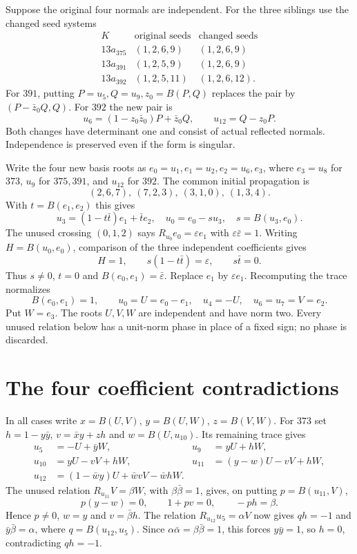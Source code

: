 \documentclass[11pt]{article}
\begin{document}
Suppose the original four normals are independent. For the three
siblings use the changed seed systems
\[
\begin{array}{c|c|c}
K&\text{original seeds}&\text{changed seeds}\\\hline
13a_{375}&(1,2,6,9)&(1,2,6,9)\\
13a_{391}&(1,2,5,9)&(1,2,6,9)\\
13a_{392}&(1,2,5,11)&(1,2,6,12).
\end{array}
\]
For $391$, putting $P=u_5,Q=u_9,z_0=B(P,Q)$ replaces the pair by
$(P-\bar z_0Q,Q)$. For $392$ the new pair is
\[
 u_6=(1-z_0\bar z_0)P+\bar z_0Q,
 \qquad u_{12}=Q-z_0P.
\]
Both changes have determinant one and consist of actual reflected
normals. Independence is preserved even if the form is singular.

Write the four new basis roots as $e_0=u_1,e_1=u_2,e_2=u_6,e_3$,
where $e_3=u_8$ for $373$, $u_9$ for $375,391$, and $u_{12}$ for
$392$. The common initial propagation is
\[
 (2,6,7),\ (7,2,3),\ (3,1,0),\ (1,3,4).
\]
With $t=B(e_1,e_2)$ this gives
\[
 u_3=(1-t\bar t)e_1+\bar t e_2,
 \quad u_0=e_0-su_3,\quad s=B(u_3,e_0).
\]
The unused crossing $(0,1,2)$ says
$R_{u_0}e_0=\varepsilon e_1$ with $\varepsilon\bar\varepsilon=1$.
Writing $H=B(u_0,e_0)$, comparison of the three independent
coefficients gives
\[
 H=1,\qquad s(1-t\bar t)=\varepsilon,\qquad s\bar t=0.
\]
Thus $s\ne0$, $t=0$ and $B(e_0,e_1)=\bar\varepsilon$.
Replace $e_1$ by $\varepsilon e_1$. Recomputing the trace normalizes
\[
 B(e_0,e_1)=1,\qquad u_0=U=e_0-e_1,
 \quad u_4=-U,\quad u_6=u_7=V=e_2.
\]
Put $W=e_3$. The roots $U,V,W$ are independent and have norm two.
Every unused relation below has a unit-norm phase in place of a
fixed sign; no phase is discarded.

\section{The four coefficient contradictions}

In all cases write $x=B(U,V)$, $y=B(U,W)$, $z=B(V,W)$.
For $373$ set $h=1-y\bar y$, $v=\bar x y+zh$ and
$w=B(U,u_{10})$. Its remaining trace gives
\[
\begin{aligned}
u_5&=-U+\bar yW,&u_9&=yU+hW,\\
u_{10}&=yU-vV+hW,&u_{11}&=(y-w)U-vV+hW,\\
u_{12}&=(1-\bar w y)U+\bar w vV-\bar w hW.
\end{aligned}
\]
The unused relation $R_{u_{11}}V=\beta W$, with $\beta\bar\beta=1$,
gives, on putting $p=B(u_{11},V)$,
\[
 p(y-w)=0,\qquad 1+pv=0,\qquad -ph=\beta.
\]
Hence $p\ne0$, $w=y$ and $v=\bar\beta h$.
The relation $R_{u_{12}}u_5=\alpha V$ now gives
$qh=-1$ and $\bar y\bar\beta=\alpha$, where $q=B(u_{12},u_5)$.
Since $\alpha\bar\alpha=\beta\bar\beta=1$, this forces
$y\bar y=1$, so $h=0$, contradicting $qh=-1$.
\end{document}
